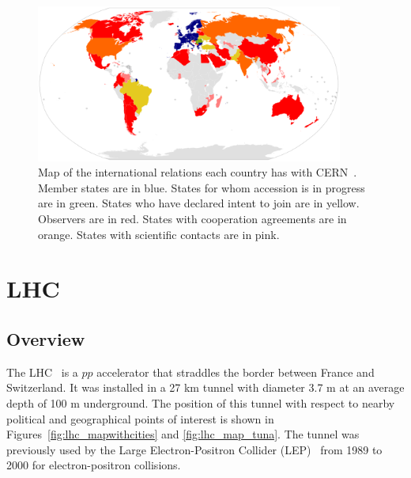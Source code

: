 \begin{figure}[htbp!]
 \begin{center}
    \includegraphics[width=0.90\textwidth]{figures/experiment/CERN_international_relations_map.pdf}
      \end{center}
\caption{Map of the international relations each country has with CERN~\cite{cern:map}.
Member states are in blue. States for whom accession is in progress are in green.
States who have declared intent to join are in yellow. Observers are in red. States with
cooperation agreements are in orange. States with scientific contacts are in pink.
}
\label{fig:cernmembers}
\end{figure}


\section{LHC\label{sec:LHC}}
\subsection{Overview}
The LHC~\cite{cern-jinst-lhc} is a $pp$ accelerator that straddles the border between France and Switzerland. It was installed in a 27 km tunnel with diameter 3.7 m at an average depth of 100 m underground.
The position of this tunnel with respect to nearby political and geographical points of interest is 
shown in Figures~\ref{fig:lhc_mapwithcities} and \ref{fig:lhc_map_tuna}.
The tunnel was previously
used by the Large Electron-Positron Collider (LEP)~\cite{LEP_DR1979} from 1989 to 2000 for electron-positron collisions.

